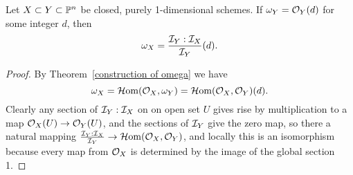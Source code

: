 \begin{corollary}\label{dualizing formula}
 Let $X\subset Y\subset \PP^{n}$ be closed, purely 1-dimensional schemes. If  $\omega_{Y} = \sO_{Y}(d)$ for some integer $d$, then 
 $$
 \omega_{X} = \frac{\sI_{Y}:\sI_{X}}{\sI_{Y}}(d).
 $$
\end{corollary}

\begin{proof}
By Theorem~\ref{construction of omega} we have 
$$
\omega_{X} = \sHom(\sO_{X}, \omega_{Y}) = \sHom(\sO_{X}, \sO_{Y})(d).
$$
Clearly any  section of $\sI_{Y}:\sI_{X}$ on on open set $U$ gives rise by multiplication to a
map   
$\sO_{X}(U) \to \sO_{Y}(U)$, and the sections of  $\sI_{Y}$ give the zero map,
so there a natural mapping $\frac{\sI_{Y}:\sI_{X}}{\sI_{Y}} \to \sHom(\sO_{X}, \sO_{Y})$,
and locally this is an isomorphism because every map from $\sO_{X}$ is determined by the image of the global section 1.
\end{proof}


